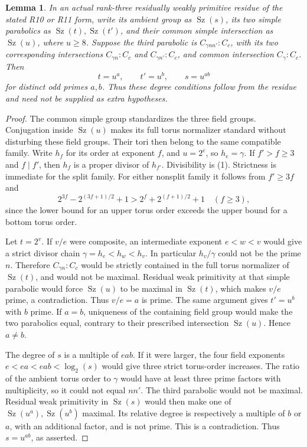 \documentclass[11pt,a4paper]{article}
\newtheorem{lemma}{Lemma}\newtheorem{theorem}[lemma]{Theorem}
\newcommand{\Sz}{\operatorname{Sz}}\newcommand{\F}{\mathbb F}
\begin{document}
\begin{lemma}\label{inputdegrees}
In an actual rank-three residually weakly primitive residue of the
stated R10 or R11 form, write its ambient group as $\Sz(s)$, its two
simple parabolics as $\Sz(t),\Sz(t')$, and their common simple
intersection as $\Sz(u)$, where $u\ge8$. Suppose the third parabolic
is $C_{\gamma nn'}:C_c$, with its two corresponding intersections
$C_{\gamma n}:C_c$ and $C_{\gamma n'}:C_c$, and common intersection
$C_\gamma:C_c$. Then
\[
 t=u^a,\qquad t'=u^b,\qquad s=u^{ab}
\]
for distinct odd primes $a,b$. Thus these degree conditions follow
from the residue and need not be supplied as extra hypotheses.
\end{lemma}
\begin{proof}
The common simple group standardizes the three field groups.
Conjugation inside $\Sz(u)$ makes its full torus normalizer standard
without disturbing these field groups. Their tori then belong to
the same compatible family. Write $h_f$ for its order at exponent
$f$, and $u=2^e$, so $h_e=\gamma$. If $f'>f\ge3$ and $f\mid f'$,
then $h_f$ is a proper divisor of $h_{f'}$. Divisibility is (1).
Strictness is immediate for the split family. For either nonsplit
family it follows from $f'\ge3f$ and
\[
 2^{3f}-2^{(3f+1)/2}+1
   >2^f+2^{(f+1)/2}+1\quad(f\ge3),
\]
since the lower bound for an upper torus order exceeds the upper
bound for a bottom torus order.

Let $t=2^v$. If $v/e$ were composite, an intermediate exponent
$e<w<v$ would give a strict divisor chain
$\gamma=h_e<h_w<h_v$. In particular $h_v/\gamma$ could not be
the prime $n$. Therefore $C_{\gamma n}:C_c$ would be strictly
contained in the full torus normalizer of $\Sz(t)$, and would not
be maximal. Residual weak primitivity at that simple parabolic
would force $\Sz(u)$ to be maximal in $\Sz(t)$, which makes $v/e$
prime, a contradiction. Thus $v/e=a$ is prime. The same argument
gives $t'=u^b$ with $b$ prime. If $a=b$, uniqueness of the containing
field group would make the two parabolics equal, contrary to their
prescribed intersection $\Sz(u)$. Hence $a\ne b$.

The degree of $s$ is a multiple of $eab$. If it were larger, the
four field exponents $e<ea<eab<\log_2(s)$ would give three strict
torus-order increases. The ratio of the ambient torus order to
$\gamma$ would have at least three prime factors with multiplicity,
so it could not equal $nn'$. The third parabolic would not be
maximal. Residual weak primitivity in $\Sz(s)$ would then make
one of $\Sz(u^a),\Sz(u^b)$ maximal. Its relative degree is respectively
a multiple of $b$ or $a$, with an additional factor, and is not prime.
This is a contradiction. Thus $s=u^{ab}$, as asserted.
\end{proof}
\end{document}
